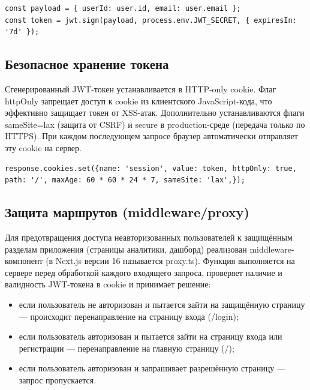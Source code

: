 \begin{code}
\label{code:JWT-token}
\vspace{-0.75cm}\begin{verbatim}
const payload = { userId: user.id, email: user.email };
const token = jwt.sign(payload, process.env.JWT_SECRET, { expiresIn: '7d' });
\end{verbatim}
\end{code}

\subsection{Безопасное хранение токена}

Сгенерированный JWT-токен устанавливается в HTTP-only cookie. Флаг httpOnly запрещает доступ к cookie из клиентского JavaScript-кода, что эффективно защищает токен от XSS-атак. Дополнительно устанавливаются флаги sameSite=lax (защита от CSRF) и secure в production-среде (передача только по HTTPS). При каждом последующем запросе браузер автоматически отправляет эту cookie на сервер.

\begin{code}
\label{code:HTTP-cookie}
\vspace{-0.75cm}\begin{verbatim}
response.cookies.set({name: 'session', value: token, httpOnly: true, path: '/', maxAge: 60 * 60 * 24 * 7, sameSite: 'lax',});
\end{verbatim}
\end{code}

\subsection{Защита маршрутов (middleware/proxy)}
Для предотвращения доступа неавторизованных пользователей к защищённым разделам приложения (страницы аналитики, дашборд) реализован middleware-компонент (в Next.js версии 16 называется proxy.ts). Функция выполняется на сервере перед обработкой каждого входящего запроса, проверяет наличие и валидность JWT-токена в cookie и принимает решение:
\begin{itemize}
\item если пользователь не авторизован и пытается зайти на защищённую страницу — происходит перенаправление на страницу входа (/login);
\item если пользователь авторизован и пытается зайти на страницу входа или регистрации — перенаправление на главную страницу (/);
\item если пользователь авторизован и запрашивает разрешённую страницу — запрос пропускается.
\end{itemize}


